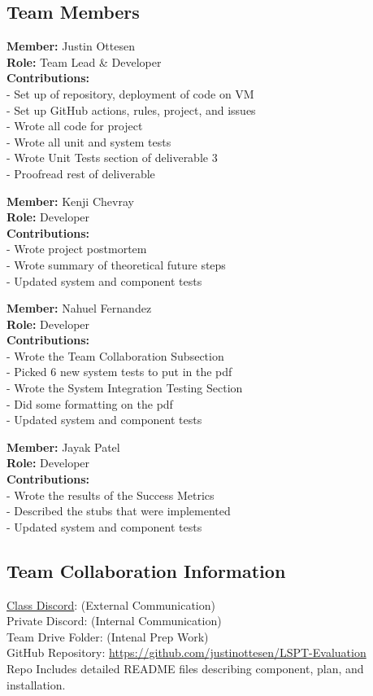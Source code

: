 \subsection*{Team Members}

\textbf{Member:} Justin Ottesen \\
\smallskip\textbf{Role:} Team Lead \& Developer \\
\smallskip\textbf{Contributions:}
\\- Set up of repository, deployment of code on VM
\\- Set up GitHub actions, rules, project, and issues
\\- Wrote all code for project
\\- Wrote all unit and system tests
\\- Wrote Unit Tests section of deliverable 3
\\- Proofread rest of deliverable

\bigskip\textbf{Member:} Kenji Chevray \\
\smallskip\textbf{Role:} Developer \\
\smallskip\textbf{Contributions:}
\\- Wrote project postmortem
\\- Wrote summary of theoretical future steps
\\- Updated system and component tests


\bigskip\textbf{Member:} Nahuel Fernandez \\
\smallskip\textbf{Role:} Developer \\
\smallskip\textbf{Contributions:}
\\- Wrote the Team Collaboration Subsection
\\- Picked 6 new system tests to put in the pdf
\\- Wrote the System Integration Testing Section
\\- Did some formatting on the pdf 
\\- Updated system and component tests

\bigskip\textbf{Member:} Jayak Patel \\
\smallskip\textbf{Role:} Developer \\
\smallskip\textbf{Contributions:}
\\- Wrote the results of the Success Metrics
\\- Described the stubs that were implemented
\\- Updated system and component tests

\subsection*{Team Collaboration Information}
\href{https://discord.gg/pMyXUx2X}{Class Discord}: (External Communication)
\\Private Discord: (Internal Communication)
\\Team Drive Folder: (Intenal Prep Work)
\\GitHub Repository: \url{https://github.com/justinottesen/LSPT-Evaluation} 
\\Repo Includes detailed README files describing component, plan, and installation.

